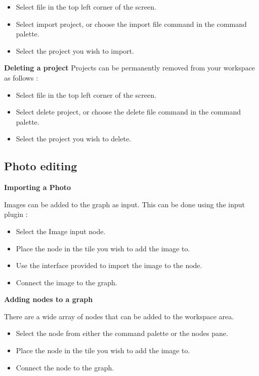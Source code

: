 \documentclass[11pt,a4paper]{article}
\begin{document}
\begin{itemize}
  \item[\textbullet] Select file in the top left corner of the screen.
  \item[\textbullet] Select import project, or choose the import file command in the command palette.
  \item[\textbullet] Select the project you wish to import.
\end{itemize}

\textbf{Deleting a project}
Projects can be permanently removed from your workspace as follows : 
\begin{itemize}
  \item[\textbullet] Select file in the top left corner of the screen.
  \item[\textbullet] Select delete project, or choose the delete file command in the command palette.
  \item[\textbullet] Select the project you wish to delete.
\end{itemize}

\subsection*{Photo editing}

\textbf{Importing a Photo}

Images can be added to the graph as input. This can be done using the input plugin : 
\begin{itemize}
  \item[\textbullet] Select the Image input node.
  \item[\textbullet] Place the node in the tile you wish to add the image to.
  \item[\textbullet] Use the interface provided to import the image to the node.
  \item[\textbullet] Connect the image to the graph.
\end{itemize}

\textbf{Adding nodes to a graph}

There are a wide array of nodes that can be added to the workspace area.
\begin{itemize}
  \item[\textbullet] Select the node from either the command palette or the nodes pane.
  \item[\textbullet] Place the node in the tile you wish to add the image to.
  \item[\textbullet] Connect the node to the graph.
\end{itemize}
\end{document}
